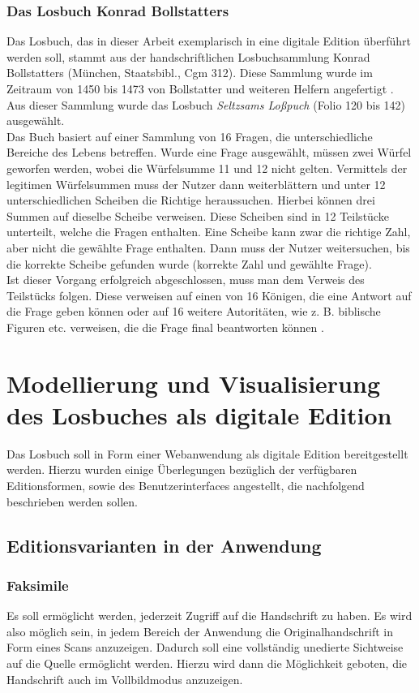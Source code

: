 \documentclass[12pt,a4paper]{article}
\begin{document}
		\subsubsection{Das Losbuch Konrad Bollstatters}
			Das Losbuch, das in dieser Arbeit exemplarisch in eine digitale Edition überführt werden soll, stammt aus der handschriftlichen Losbuchsammlung Konrad Bollstatters (München, Staatsbibl., Cgm 312).  
			Diese Sammlung wurde im Zeitraum von 1450 bis 1473 von Bollstatter und weiteren Helfern angefertigt \parencite[S.~239]{heiles}. Aus dieser Sammlung wurde das Losbuch \textit{Seltzsams Loßpuch} (Folio 120 bis 142) 
			ausgewählt.\\
			Das Buch basiert auf einer Sammlung von 16 Fragen, die unterschiedliche Bereiche des Lebens betreffen. Wurde eine Frage ausgewählt, müssen zwei Würfel geworfen werden, wobei die Würfelsumme 11 und 12 nicht gelten. 
			Vermittels der legitimen Würfelsummen muss der Nutzer dann weiterblättern und unter 12 unterschiedlichen Scheiben die Richtige heraussuchen. Hierbei können drei Summen auf dieselbe Scheibe verweisen. 
			Diese Scheiben sind in 12 Teilstücke unterteilt, welche die Fragen enthalten. Eine Scheibe kann zwar die richtige Zahl, aber nicht die gewählte Frage enthalten. Dann muss der Nutzer weitersuchen, 
			bis die korrekte Scheibe gefunden wurde (korrekte Zahl und gewählte Frage).\\
			Ist dieser Vorgang erfolgreich abgeschlossen, muss man dem Verweis des Teilstücks folgen. Diese verweisen auf einen von 16 Königen, die eine Antwort auf die Frage geben können oder auf 16 weitere 
			Autoritäten, wie z. B. biblische Figuren etc. verweisen, die die Frage final beantworten können \parencite[S.~4]{cugliana}.

\section{Modellierung und Visualisierung des Losbuches als digitale Edition}
	Das Losbuch soll in Form einer Webanwendung als digitale Edition bereitgestellt werden. 
	Hierzu wurden einige Überlegungen bezüglich der verfügbaren Editionsformen, sowie des Benutzerinterfaces angestellt, 
	die nachfolgend beschrieben werden sollen.
	\subsection{Editionsvarianten in der Anwendung}
		\subsubsection{Faksimile}
			Es soll ermöglicht werden, jederzeit Zugriff auf die Handschrift zu haben. Es wird also möglich sein, in jedem Bereich der 
			Anwendung die Originalhandschrift in Form eines Scans anzuzeigen. 
			Dadurch soll eine vollständig unedierte Sichtweise auf die Quelle ermöglicht werden. 
			Hierzu wird dann die Möglichkeit geboten, die Handschrift auch im Vollbildmodus anzuzeigen.
\end{document}
